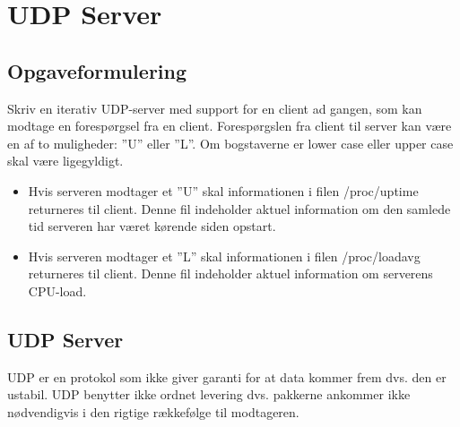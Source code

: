 \chapter{UDP Server}

\section{Opgaveformulering}

Skriv en iterativ UDP-server med support for en client ad gangen, som kan modtage
en forespørgsel fra en client.
Forespørgslen fra client til server kan være en af to muligheder: ”U” eller ”L”. Om
bogstaverne er lower case eller upper case skal være ligegyldigt.
\begin{itemize}
	\item Hvis serveren modtager et ”U” skal informationen i filen /proc/uptime
	returneres til client. Denne fil indeholder aktuel information om den samlede
	tid serveren har været kørende siden opstart.\\
	
	\item Hvis serveren modtager et ”L” skal informationen i filen /proc/loadavg
	returneres til client. Denne fil indeholder aktuel information om serverens
	CPU-load.
\end{itemize}

\section{UDP Server}
 
UDP er en protokol som ikke giver garanti for at data kommer frem dvs. den er ustabil. UDP benytter ikke ordnet levering dvs. pakkerne ankommer ikke nødvendigvis i den rigtige rækkefølge til modtageren. 
